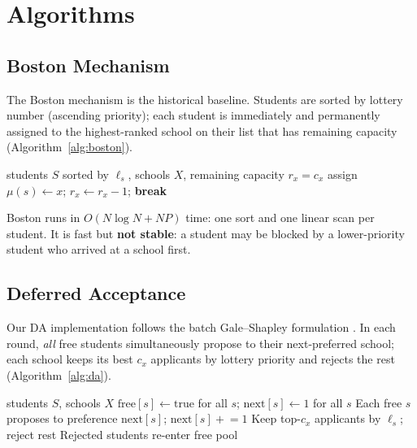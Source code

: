 \documentclass{article}
\theoremstyle{plain}
\theoremstyle{definition}
\theoremstyle{remark}
\begin{document}
\section{Algorithms}
\label{sec:algorithms}

\subsection{Boston Mechanism}

The Boston mechanism is the historical baseline. Students are sorted by
lottery number (ascending priority); each student is immediately and
permanently assigned to the highest-ranked school on their list that has
remaining capacity (Algorithm~\ref{alg:boston}).

\begin{algorithm}[tb]
   \caption{Boston Mechanism}
   \label{alg:boston}
\begin{algorithmic}
    students $S$ sorted by $\ell_s$, schools $X$,
          remaining capacity $r_x = c_x$
         \STATE assign $\mu(s) \leftarrow x$; $r_x \leftarrow r_x - 1$; \textbf{break}
       \ENDIF
     \ENDFOR
   \ENDFOR
\end{algorithmic}
\end{algorithm}

Boston runs in $O(N \log N + NP)$ time: one sort and one linear scan per
student. It is fast but \textbf{not stable}: a student may be blocked by a
lower-priority student who arrived at a school first.

\subsection{Deferred Acceptance}

Our DA implementation follows the batch Gale--Shapley formulation
\cite{gale1962college}. In each round, \emph{all} free students
simultaneously propose to their next-preferred school; each school keeps its
best $c_x$ applicants by lottery priority and rejects the rest
(Algorithm~\ref{alg:da}).

\begin{algorithm}[tb]
   \caption{Batch Deferred Acceptance}
   \label{alg:da}
\begin{algorithmic}
    students $S$, schools $X$
   \STATE $\text{free}[s] \leftarrow \text{true}$ for all $s$;
          $\text{next}[s] \leftarrow 1$ for all $s$
   \REPEAT
     \STATE Each free $s$ proposes to preference $\text{next}[s]$;
            $\text{next}[s] \mathrel{+}= 1$
       \STATE Keep top-$c_x$ applicants by $\ell_s$; reject rest
       \STATE Rejected students re-enter free pool
     \ENDFOR
\end{algorithmic}
\end{algorithm}
\end{document}
